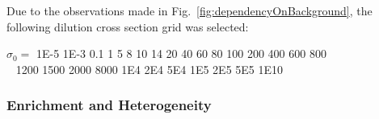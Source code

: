 \documentclass[10pt]{article}
\begin{document}
Due to the observations made in Fig.~\ref{fig:dependencyOnBackground}, the following dilution cross section grid was selected:\par
$\sigma_0 =$ 1E-5 1E-3 0.1 1 5 8 10 14 20 40 60 80 100 200 400 600 800 \\
\null\qquad~ 1200 1500 2000 8000 1E4 2E4 5E4 1E5 2E5 5E5 1E10







\subsubsection{Enrichment and Heterogeneity}\label{enrichment}
\end{document}

